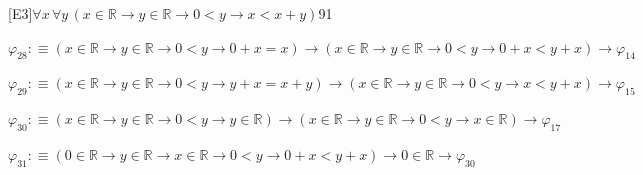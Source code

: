 \begin{fullproof}{[E3]}{$\forall x\,\forall y\,(x \in \mathbb{R} \to y \in \mathbb{R} \to 0 < y \to x < x + y)$}{91}
\begin{abbrevlist}
\item $\varphi_{28} :\equiv (x \in \mathbb{R} \to y \in \mathbb{R} \to 0 < y \to 0 + x = x) \to (x \in \mathbb{R} \to y \in \mathbb{R} \to 0 < y \to 0 + x < y + x) \to \varphi_{14}$
\item $\varphi_{29} :\equiv (x \in \mathbb{R} \to y \in \mathbb{R} \to 0 < y \to y + x = x + y) \to (x \in \mathbb{R} \to y \in \mathbb{R} \to 0 < y \to x < y + x) \to \varphi_{15}$
\item $\varphi_{30} :\equiv (x \in \mathbb{R} \to y \in \mathbb{R} \to 0 < y \to y \in \mathbb{R}) \to (x \in \mathbb{R} \to y \in \mathbb{R} \to 0 < y \to x \in \mathbb{R}) \to \varphi_{17}$
\item $\varphi_{31} :\equiv (0 \in \mathbb{R} \to y \in \mathbb{R} \to x \in \mathbb{R} \to 0 < y \to 0 + x < y + x) \to 0 \in \mathbb{R} \to \varphi_{30}$
\end{abbrevlist}
\end{fullproof}
